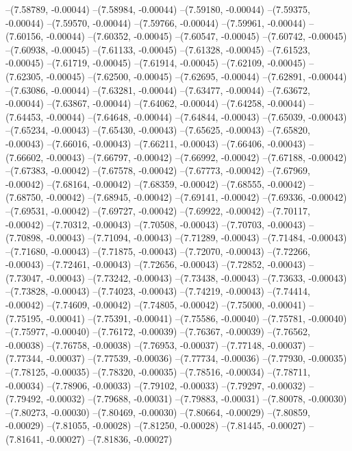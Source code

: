 --(7.58789, -0.00044)
--(7.58984, -0.00044)
--(7.59180, -0.00044)
--(7.59375, -0.00044)
--(7.59570, -0.00044)
--(7.59766, -0.00044)
--(7.59961, -0.00044)
--(7.60156, -0.00044)
--(7.60352, -0.00045)
--(7.60547, -0.00045)
--(7.60742, -0.00045)
--(7.60938, -0.00045)
--(7.61133, -0.00045)
--(7.61328, -0.00045)
--(7.61523, -0.00045)
--(7.61719, -0.00045)
--(7.61914, -0.00045)
--(7.62109, -0.00045)
--(7.62305, -0.00045)
--(7.62500, -0.00045)
--(7.62695, -0.00044)
--(7.62891, -0.00044)
--(7.63086, -0.00044)
--(7.63281, -0.00044)
--(7.63477, -0.00044)
--(7.63672, -0.00044)
--(7.63867, -0.00044)
--(7.64062, -0.00044)
--(7.64258, -0.00044)
--(7.64453, -0.00044)
--(7.64648, -0.00044)
--(7.64844, -0.00043)
--(7.65039, -0.00043)
--(7.65234, -0.00043)
--(7.65430, -0.00043)
--(7.65625, -0.00043)
--(7.65820, -0.00043)
--(7.66016, -0.00043)
--(7.66211, -0.00043)
--(7.66406, -0.00043)
--(7.66602, -0.00043)
--(7.66797, -0.00042)
--(7.66992, -0.00042)
--(7.67188, -0.00042)
--(7.67383, -0.00042)
--(7.67578, -0.00042)
--(7.67773, -0.00042)
--(7.67969, -0.00042)
--(7.68164, -0.00042)
--(7.68359, -0.00042)
--(7.68555, -0.00042)
--(7.68750, -0.00042)
--(7.68945, -0.00042)
--(7.69141, -0.00042)
--(7.69336, -0.00042)
--(7.69531, -0.00042)
--(7.69727, -0.00042)
--(7.69922, -0.00042)
--(7.70117, -0.00042)
--(7.70312, -0.00043)
--(7.70508, -0.00043)
--(7.70703, -0.00043)
--(7.70898, -0.00043)
--(7.71094, -0.00043)
--(7.71289, -0.00043)
--(7.71484, -0.00043)
--(7.71680, -0.00043)
--(7.71875, -0.00043)
--(7.72070, -0.00043)
--(7.72266, -0.00043)
--(7.72461, -0.00043)
--(7.72656, -0.00043)
--(7.72852, -0.00043)
--(7.73047, -0.00043)
--(7.73242, -0.00043)
--(7.73438, -0.00043)
--(7.73633, -0.00043)
--(7.73828, -0.00043)
--(7.74023, -0.00043)
--(7.74219, -0.00043)
--(7.74414, -0.00042)
--(7.74609, -0.00042)
--(7.74805, -0.00042)
--(7.75000, -0.00041)
--(7.75195, -0.00041)
--(7.75391, -0.00041)
--(7.75586, -0.00040)
--(7.75781, -0.00040)
--(7.75977, -0.00040)
--(7.76172, -0.00039)
--(7.76367, -0.00039)
--(7.76562, -0.00038)
--(7.76758, -0.00038)
--(7.76953, -0.00037)
--(7.77148, -0.00037)
--(7.77344, -0.00037)
--(7.77539, -0.00036)
--(7.77734, -0.00036)
--(7.77930, -0.00035)
--(7.78125, -0.00035)
--(7.78320, -0.00035)
--(7.78516, -0.00034)
--(7.78711, -0.00034)
--(7.78906, -0.00033)
--(7.79102, -0.00033)
--(7.79297, -0.00032)
--(7.79492, -0.00032)
--(7.79688, -0.00031)
--(7.79883, -0.00031)
--(7.80078, -0.00030)
--(7.80273, -0.00030)
--(7.80469, -0.00030)
--(7.80664, -0.00029)
--(7.80859, -0.00029)
--(7.81055, -0.00028)
--(7.81250, -0.00028)
--(7.81445, -0.00027)
--(7.81641, -0.00027)
--(7.81836, -0.00027)

